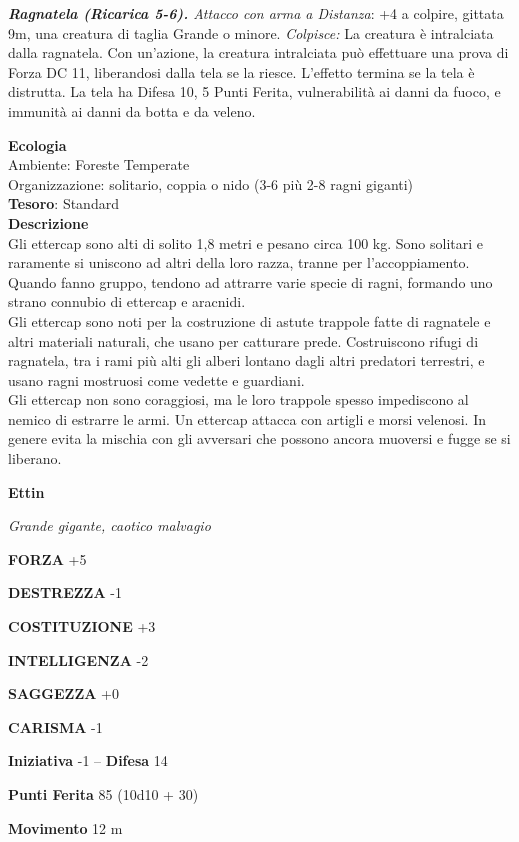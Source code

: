 \begin{multicols}{2}
	\textit{\textbf{Ragnatela (Ricarica 5-6).} Attacco con arma a Distanza}: +4 a colpire, gittata 9m, una creatura di taglia Grande o minore. \textit{Colpisce:} La creatura è intralciata dalla ragnatela. Con un'azione, la creatura intralciata può effettuare una prova di Forza DC 11, liberandosi dalla tela se la riesce. L'effetto termina se la tela è distrutta. La tela ha Difesa 10, 5 Punti Ferita, vulnerabilità ai danni da fuoco, e immunità ai danni da botta e da veleno.

	\textbf{Ecologia}\\
	Ambiente: Foreste Temperate\\
	Organizzazione: solitario, coppia o nido (3-6 più 2-8 ragni giganti)\\
	\textbf{Tesoro}: Standard\\
	\textbf{Descrizione}\\
	Gli ettercap sono alti di solito 1,8 metri e pesano circa 100 kg. Sono solitari e raramente si uniscono ad altri della loro razza, tranne per l'accoppiamento. Quando fanno gruppo, tendono ad attrarre varie specie di ragni, formando uno strano connubio di ettercap e aracnidi.\\
	Gli ettercap sono noti per la costruzione di astute trappole fatte di ragnatele e altri materiali naturali, che usano per catturare prede. Costruiscono rifugi di ragnatela, tra i rami più alti gli alberi lontano dagli altri predatori terrestri, e usano ragni mostruosi come vedette e guardiani.\\
	Gli ettercap non sono coraggiosi, ma le loro trappole spesso impediscono al nemico di estrarre le armi. Un ettercap attacca con artigli e morsi velenosi. In genere evita la mischia con gli avversari che possono ancora muoversi e fugge se si liberano.


	\medskip{}\textbf{Ettin}

	\textit{Grande gigante, caotico malvagio}

	\textbf{FORZA} +5

	\textbf{DESTREZZA} -1

	\textbf{COSTITUZIONE} +3

	\textbf{INTELLIGENZA} -2

	\textbf{SAGGEZZA} +0

	\textbf{CARISMA} -1

	\textbf{Iniziativa} -1 -- \textbf{Difesa} 14

	\textbf{Punti Ferita} 85 (10d10 + 30)

	\textbf{Movimento} 12 m


\end{multicols}

